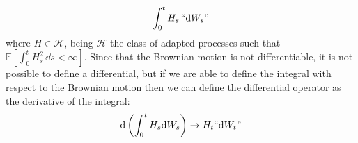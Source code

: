 \begin{equation*}
    \int_0^t H_s\,``\dd W_s"
\end{equation*}
where $H\in\mathcal{H}$, being $\mathcal{H}$ the class of adapted processes such that $\mathbb{E}[\int_0^t H^2_s\,\dd s<\infty]$.
Since that the Brownian motion is not differentiable, it is not possible to define a differential, but if we are able to define the integral with respect to the Brownian motion then we can define the differential operator as the derivative of the integral:
\begin{equation*}
    \dd\left(\int^t_0 H_s \dd W_s\right) \to H_t``\dd W_t"
\end{equation*}
